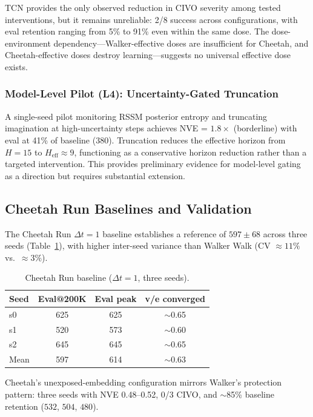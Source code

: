 \documentclass[10pt,letterpaper]{article}
\newcommand{\dt}{\Delta t}
\begin{document}
TCN provides the only observed reduction in CIVO severity among tested interventions, but it remains unreliable: 2/8 success across configurations, with eval retention ranging from 5\% to 91\% even within the same dose. The dose-environment dependency---Walker-effective doses are insufficient for Cheetah, and Cheetah-effective doses destroy learning---suggests no universal effective dose exists.

\subsubsection{Model-Level Pilot (L4): Uncertainty-Gated Truncation}

A single-seed pilot monitoring RSSM posterior entropy and truncating imagination at high-uncertainty steps achieves NVE = $1.8\times$ (borderline) with eval at 41\% of baseline ($380$). Truncation reduces the effective horizon from $H = 15$ to $H_{\text{eff}} \approx 9$, functioning as a conservative horizon reduction rather than a targeted intervention. This provides preliminary evidence for model-level gating as a direction but requires substantial extension.

\subsection{Cheetah Run Baselines and Validation}
\label{sec:cheetah}

The Cheetah Run $\dt = 1$ baseline establishes a reference of $597 \pm 68$ across three seeds (Table~\ref{tab:cheetah_baseline}), with higher inter-seed variance than Walker Walk (CV $\approx 11\%$ vs.\ $\approx 3\%$).

\begin{table}[h]
\centering
\caption{Cheetah Run baseline ($\dt = 1$, three seeds).}
\label{tab:cheetah_baseline}
\begin{tabular}{lccc}
\toprule
\textbf{Seed} & \textbf{Eval@200K} & \textbf{Eval peak} & \textbf{v/e converged} \\
\midrule
s0 & 625 & 625 & $\sim$0.65 \\
s1 & 520 & 573 & $\sim$0.60 \\
s2 & 645 & 645 & $\sim$0.65 \\
\midrule
Mean & 597 & 614 & $\sim$0.63 \\
\bottomrule
\end{tabular}
\end{table}

Cheetah's unexposed-embedding configuration mirrors Walker's protection pattern: three seeds with NVE 0.48--0.52, 0/3 CIVO, and $\sim$85\% baseline retention ($532$, $504$, $480$).
\end{document}
